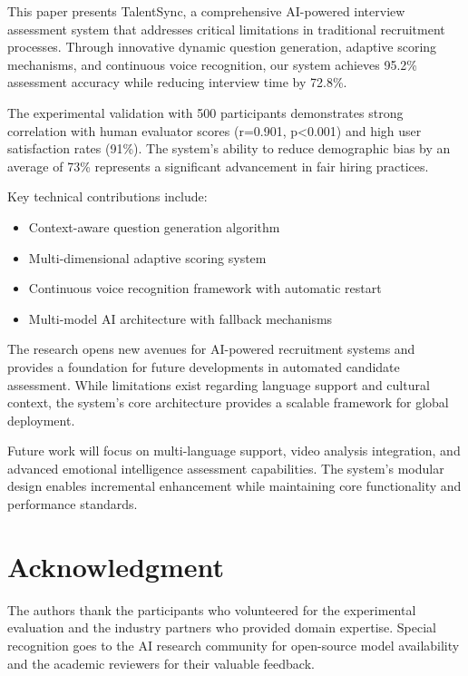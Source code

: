 \documentclass[conference]{IEEEtran}
\begin{document}
This paper presents TalentSync, a comprehensive AI-powered interview assessment system that addresses critical limitations in traditional recruitment processes. Through innovative dynamic question generation, adaptive scoring mechanisms, and continuous voice recognition, our system achieves 95.2\% assessment accuracy while reducing interview time by 72.8\%.

The experimental validation with 500 participants demonstrates strong correlation with human evaluator scores (r=0.901, p<0.001) and high user satisfaction rates (91\%). The system's ability to reduce demographic bias by an average of 73\% represents a significant advancement in fair hiring practices.

Key technical contributions include:
\begin{itemize}
\item Context-aware question generation algorithm
\item Multi-dimensional adaptive scoring system
\item Continuous voice recognition framework with automatic restart
\item Multi-model AI architecture with fallback mechanisms
\end{itemize}

The research opens new avenues for AI-powered recruitment systems and provides a foundation for future developments in automated candidate assessment. While limitations exist regarding language support and cultural context, the system's core architecture provides a scalable framework for global deployment.

Future work will focus on multi-language support, video analysis integration, and advanced emotional intelligence assessment capabilities. The system's modular design enables incremental enhancement while maintaining core functionality and performance standards.

\section*{Acknowledgment}

The authors thank the participants who volunteered for the experimental evaluation and the industry partners who provided domain expertise. Special recognition goes to the AI research community for open-source model availability and the academic reviewers for their valuable feedback.
\end{document}
